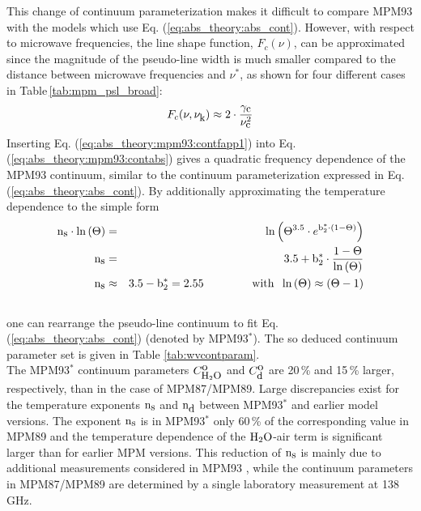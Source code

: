This change of continuum parameterization makes it difficult 
to compare MPM93 with the models which use Eq. (\ref{eq:abs_theory:abs_cont}). 
However, with respect to microwave frequencies, the 
line shape function, $F_c(\nu)$, can be approximated since 
the magnitude of the pseudo-line width is much smaller compared to the 
distance between microwave frequencies and $\nu^*$, as 
shown for four different cases in Table\,\ref{tab:mpm_psl_broad}:
\begin{equation}
 \label{eq:abs_theory:mpm93:contfapp1}
 F_{c}(\nu,\nu_{\mbox{\rm \small k}}) \approx 2 \cdot \frac{\gamma_{\mbox{\rm \small c}}}{\nu_{\mbox{\rm \small c}}^2}
\end{equation}
Inserting Eq. (\ref{eq:abs_theory:mpm93:contfapp1}) into Eq. (\ref{eq:abs_theory:mpm93:contabs})
gives a quadratic frequency dependence of the MPM93 continuum,
similar to the continuum parameterization expressed in 
Eq. (\ref{eq:abs_theory:abs_cont}). By additionally approximating 
the temperature dependence to the simple form
\begin{eqnarray}
  \xs\cdot\ln{(\Theta)} & = & 
  \ln{\left(\Theta^{3.5} \cdot e^{\bzks\cdot(1-\Theta)}\right)}\nonumber\\
%
  \xs  & = & 3.5 +
  \bzks\cdot\frac{1-\Theta}{\ln{(\Theta)}}\nonumber\\
%
  \xs & \approx & 3.5 -\bzks = 2.55\hspace*{15mm}\mbox{with}\hspace*{2mm}
                 \ln{(\Theta)}\approx(\Theta-1)\\
\nonumber
\end{eqnarray}
%
one can rearrange the pseudo-line continuum to fit Eq. (\ref{eq:abs_theory:abs_cont})
(denoted by MPM93$^*$). The so deduced continuum parameter set is given in 
Table \ref{tab:wvcontparam}.\\
The MPM93$^*$ continuum parameters $C^{\mbox{\rm o}}_{\mbox{\rm \small H}_{2}\mbox{\rm \small O}}$ and $C^{\mbox{\rm o}}_{\mbox{\rm \small d}}$ are 20\,\% and 
15\,\% larger, respectively, than in the case of MPM87/MPM89. 
Large discrepancies exist for the temperature exponents ${\rm n}_{\mbox{\rm \small s}}$ 
and ${\rm n}_{\mbox{\rm \small d}}$ between MPM93$^*$ and earlier model versions. The 
exponent ${\rm n}_{\mbox{\rm \small s}}$ is in MPM93$^*$ only 60\,\% of the corresponding 
value in MPM89 and the temperature dependence of the $\mbox{H}_2\mbox{O}$-air 
term is significant larger than for earlier MPM versions.
This reduction of ${\rm n}_{\mbox{\rm \small s}}$ is mainly due to additional measurements 
considered in MPM93 \citep{beckerautler:46,godonetal:92}, 
while the continuum parameters in MPM87/MPM89 are determined 
by a single laboratory measurement at 138\,GHz.



